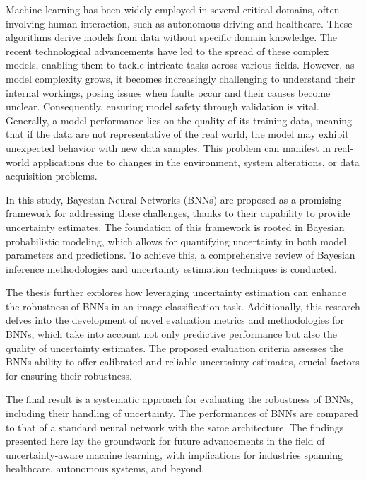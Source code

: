 Machine learning has been widely employed in several critical domains, often involving human interaction, such as autonomous driving and healthcare. These algorithms derive models from data without specific domain knowledge. The recent technological advancements have led to the spread of these complex models, enabling them to tackle intricate tasks across various fields. However, as model complexity grows, it becomes increasingly challenging to understand their internal workings, posing issues when faults occur and their causes become unclear. Consequently, ensuring model safety through validation is vital.
Generally, a model performance lies on the quality of its training data, meaning that if the data are not representative of the real world, the model may exhibit unexpected behavior with new data samples. This problem can manifest in real-world applications due to changes in the environment, system alterations, or data acquisition problems.

In this study, Bayesian Neural Networks (BNNs) are proposed as a promising framework for addressing these challenges, thanks to their capability to provide uncertainty estimates. The foundation of this framework is rooted in Bayesian probabilistic modeling, which allows for quantifying uncertainty in both model parameters and predictions. To achieve this, a comprehensive review of Bayesian inference methodologies and uncertainty estimation techniques is conducted.

The thesis further explores how leveraging uncertainty estimation can enhance the robustness of BNNs in an image classification task. Additionally, this research delves into the development of novel evaluation metrics and methodologies for BNNs, which take into account not only predictive performance but also the quality of uncertainty estimates. The proposed evaluation criteria assesses the BNNs ability to offer calibrated and reliable uncertainty estimates, crucial factors for ensuring their robustness.

The final result is a systematic approach for evaluating the robustness of BNNs, including their handling of uncertainty. The performances of BNNs are compared to that of a standard neural network with the same architecture. The findings presented here lay the groundwork for future advancements in the field of uncertainty-aware machine learning, with implications for industries spanning healthcare, autonomous systems, and beyond.